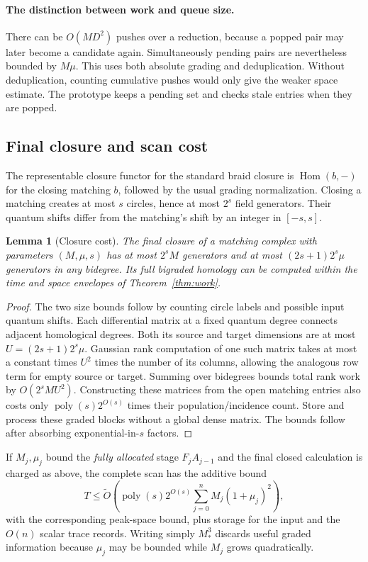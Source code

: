 \documentclass[11pt,letterpaper]{article}
\newtheorem{lemma}[theorem]{Lemma}
\theoremstyle{remark}\newtheorem{remark}[theorem]{Remark}
\newcommand{\Hom}{\operatorname{Hom}}
\newcommand{\poly}{\operatorname{poly}}
\begin{document}
\paragraph{The distinction between work and queue size.}
There can be $O(MD^2)$ pushes over a reduction, because a popped pair may later become a candidate again. Simultaneously pending pairs are nevertheless bounded by $M\mu$. This uses both absolute grading and deduplication. Without deduplication, counting cumulative pushes would only give the weaker space estimate. The prototype keeps a pending set and checks stale entries when they are popped.

\subsection{Final closure and scan cost}
The representable closure functor for the standard braid closure is $\Hom(b,-)$ for the closing matching $b$, followed by the usual grading normalization. Closing a matching creates at most $s$ circles, hence at most $2^s$ field generators. Their quantum shifts differ from the matching's shift by an integer in $[-s,s]$.

\begin{lemma}[Closure cost]\label{lem:closure}
The final closure of a matching complex with parameters $(M,\mu,s)$ has at most $2^sM$ generators and at most $(2s+1)2^s\mu$ generators in any bidegree. Its full bigraded homology can be computed within the time and space envelopes of Theorem~\ref{thm:work}.
\end{lemma}
\begin{proof}
The two size bounds follow by counting circle labels and possible input quantum shifts. Each differential matrix at a fixed quantum degree connects adjacent homological degrees. Both its source and target dimensions are at most $U=(2s+1)2^s\mu$. Gaussian rank computation of one such matrix takes at most a constant times $U^2$ times the number of its columns, allowing the analogous row term for empty source or target. Summing over bidegrees bounds total rank work by $O(2^sMU^2)$. Constructing these matrices from the open matching entries also costs only $\poly(s)2^{O(s)}$ times their population/incidence count. Store and process these graded blocks without a global dense matrix. The bounds follow after absorbing exponential-in-$s$ factors.
\end{proof}

If $M_j,\mu_j$ bound the \emph{fully allocated} stage $F_jA_{j-1}$ and the final closed calculation is charged as above, the complete scan has the additive bound
\begin{equation}\label{eq:sumcost}
 T\le\widetilde O\!\left(\poly(s)2^{O(s)}
 \sum_{j=0}^n M_j(1+\mu_j)^2\right),
\end{equation}
with the corresponding peak-space bound, plus storage for the input and the $O(n)$ scalar trace records. Writing simply $M_*^3$ discards useful graded information because $\mu_j$ may be bounded while $M_j$ grows quadratically.
\end{document}

